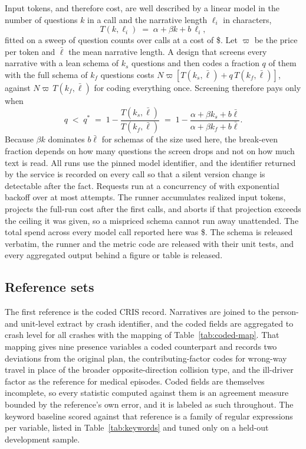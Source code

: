 Input tokens, and therefore cost, are well described by a linear model in the number of
questions $k$ in a call and the narrative length $\ell_i$ in characters,
\begin{equation}
T(k, \ell_i) \;=\; \alpha + \beta k + b\,\ell_i,
\label{eq:cost}
\end{equation}
fitted on a sweep of \CostSweepQuestionSets{} question counts over \CostSweepCalls{} calls at a
cost of \$\CostSweepCost{}. Let $\varpi$ be the price per token and $\bar{\ell}$ the mean
narrative length. A design that screens every narrative with a lean schema of $k_s$ questions
and then codes a fraction $q$ of them with the full schema of $k_f$ questions costs
$N\varpi[T(k_s, \bar{\ell}) + q\,T(k_f, \bar{\ell})]$, against $N\varpi\,T(k_f, \bar{\ell})$
for coding everything once. Screening therefore pays only when
\begin{equation}
q \;<\; q^{*} \;=\; 1 - \frac{T(k_s, \bar{\ell})}{T(k_f, \bar{\ell})}
\;=\; 1 - \frac{\alpha + \beta k_s + b\bar{\ell}}{\alpha + \beta k_f + b\bar{\ell}}.
\label{eq:twostage}
\end{equation}
Because $\beta k$ dominates $b\bar{\ell}$ for schemas of the size used here, the break-even
fraction depends on how many questions the screen drops and not on how much text is read.
All runs use the pinned model identifier, and the identifier returned by the service is
recorded on every call so that a silent version change is detectable after the fact.
Requests run at a concurrency of \ConcurrencyN{} with exponential backoff over at most
\MaxTries{} attempts. The runner accumulates realized input tokens, projects the full-run cost
after the first \ProjectAfterCalls{} calls, and aborts if that projection exceeds the ceiling
it was given, so a mispriced schema cannot run away unattended. The total spend across
every model call reported here was \$\TotalSpend{}. The schema is
released verbatim, the runner and the metric code are released with their unit tests, and
every aggregated output behind a figure or table is released.


\subsection{Reference sets}
\label{sec:reference}

The first reference is the coded CRIS record. Narratives are joined to the person- and
unit-level extract by crash identifier, and the coded fields are aggregated to crash level for
all \NCrashesJoined{} crashes with the mapping of Table~\ref{tab:coded-map}. That mapping gives
nine presence variables a coded counterpart and records two deviations from the original plan,
the contributing-factor codes for wrong-way travel in place of the broader opposite-direction
collision type, and the ill-driver factor as the reference for medical episodes. Coded fields
are themselves incomplete, so every statistic computed against them is an agreement measure
bounded by the reference's own error, and it is labeled as such throughout. The keyword baseline
scored against that reference is a family of regular expressions per variable, listed in
Table~\ref{tab:keywords} and tuned only on a held-out development sample.

